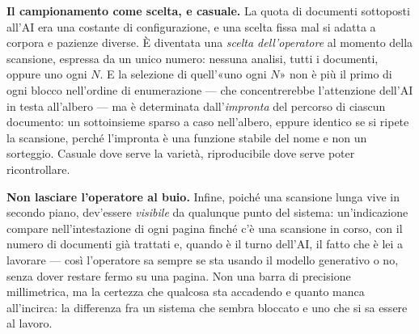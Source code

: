\textbf{Il campionamento come scelta, e casuale.} La quota di documenti sottoposti all'AI era una costante di configurazione, e una scelta fissa mal si adatta a corpora e pazienze diverse. È diventata una \emph{scelta dell'operatore} al momento della scansione, espressa da un unico numero: nessuna analisi, tutti i documenti, oppure uno ogni $N$. E la selezione di quell'«uno ogni $N$» non è più il primo di ogni blocco nell'ordine di enumerazione --- che concentrerebbe l'attenzione dell'AI in testa all'albero --- ma è determinata dall'\emph{impronta} del percorso di ciascun documento: un sottoinsieme sparso a caso nell'albero, eppure identico se si ripete la scansione, perché l'impronta è una funzione stabile del nome e non un sorteggio. Casuale dove serve la varietà, riproducibile dove serve poter ricontrollare. \medskip

\textbf{Non lasciare l'operatore al buio.} Infine, poiché una scansione lunga vive in secondo piano, dev'essere \emph{visibile} da qualunque punto del sistema: un'indicazione compare nell'intestazione di ogni pagina finché c'è una scansione in corso, con il numero di documenti già trattati e, quando è il turno dell'AI, il fatto che è lei a lavorare --- così l'operatore sa sempre se sta usando il modello generativo o no, senza dover restare fermo su una pagina. Non una barra di precisione millimetrica, ma la certezza che qualcosa sta accadendo e quanto manca all'incirca: la differenza fra un sistema che sembra bloccato e uno che si sa essere al lavoro. \medskip

